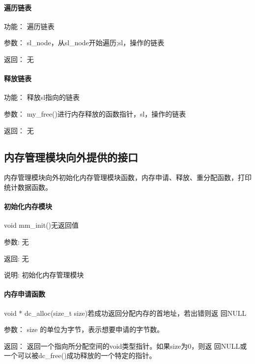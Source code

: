 \paragraph{遍历链表}
	\begin{compactdesc}
	\item[功能：]遍历链表
	\item[参数：]sl\_node，从sl\_node开始遍历;sl，操作的链表
	\item[返回：]无
	\end{compactdesc}
\paragraph{ 释放链表}
	\begin{compactdesc}
	\item[功能：]释放sl指向的链表
	\item[参数：]my\_free()进行内存释放的函数指针，sl，操作的链表
	\item[返回：]无
	\end{compactdesc}


\subsection{内存管理模块向外提供的接口}
内存管理模块向外初始化内存管理模块函数，内存申请、释放、重分配函数，打印
统计数据函数。
\paragraph{初始化内存模块}
{void mm\_init()}{无返回值}
	\begin{compactdesc}
	\item[参数:]无
	\item[返回:]无
	\item[说明:]初始化内存管理模块
	\end{compactdesc}

\paragraph{内存申请函数}
	{void * dc\_alloc(size\_t size)}{若成功返回分配内存的首地址，若出错则返
	回NULL}
	\begin{compactdesc}
	\item[参数：]size 的单位为字节，表示想要申请的字节数。
	\item[返回：]返回一个指向所分配空间的void类型指针。如果size为0，则返
	回NULL或一个可以被dc\_free()成功释放的一个特定的指针。
	\end{compactdesc}
